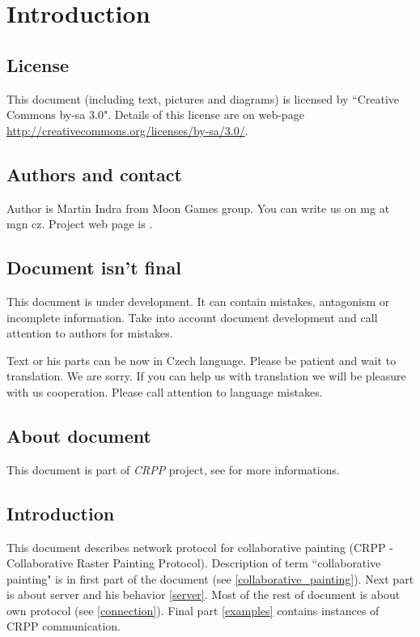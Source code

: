 \chapter{Introduction}

\section{License}

This document (including text, pictures and diagrams) is licensed by ``Creative Commons by-sa 3.0". Details of this license are on web-page \url{http://creativecommons.org/licenses/by-sa/3.0/}.

\section{Authors and contact}

Author is Martin Indra from Moon Games group. You can write us on mg at mgn cz. Project web page is \webURL{}.

\section{Document isn't final}

This document is under development. It can contain mistakes, antagonism or incomplete information. Take into account document development and call attention to authors for mistakes.

Text or his parts can be now in Czech language. Please be patient and wait to translation. We are sorry. If you can help us with translation we will be pleasure with us cooperation. Please call attention to language mistakes.

\section{About document}

This document is part of \emph{CRPP} project, see \webURL for more informations.

\section{Introduction}

This document describes network protocol for collaborative painting (CRPP - Collaborative Raster Painting Protocol). Description of term ``collaborative painting" is in first part of the document (see \ref{collaborative_painting}). Next part is about server and his behavior \ref{server}. Most of the rest of document is about own protocol (see \ref{connection}). Final part \ref{examples} contains instances of CRPP communication.
